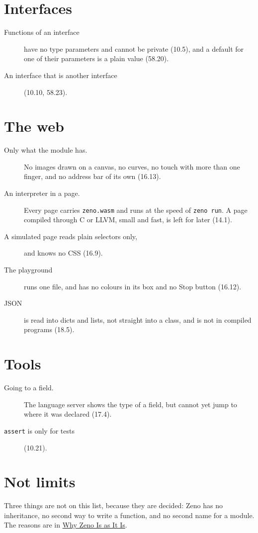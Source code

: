 \section{Interfaces}

\begin{description}
\item[Functions of an interface] have no type parameters and cannot
  be private (10.5), and a default for one of their parameters is a
  plain value (58.20).
\item[An interface that is another interface] (10.10, 58.23).
\end{description}

\section{The web}

\begin{description}
\item[Only what the module has.] No images drawn on a canvas, no
  curves, no touch with more than one finger, and no address bar of
  its own (16.13).
\item[An interpreter in a page.] Every page carries \verb|zeno.wasm|
  and runs at the speed of \verb|zeno run|. A page compiled through C
  or LLVM, small and fast, is left for later (14.1).
\item[A simulated page reads plain selectors only,] and knows no CSS
  (16.9).
\item[The playground] runs one file, and has no colours in its box and
  no Stop button (16.12).
\item[JSON] is read into dicts and lists, not straight into a class,
  and is not in compiled programs (18.5).
\end{description}

\section{Tools}

\begin{description}
\item[Going to a field.] The language server shows the type of a
  field, but cannot yet jump to where it was declared (17.4).
\item[\texttt{assert} is only for tests] (10.21).
\end{description}

\section{Not limits}

Three things are not on this list, because they are decided: Zeno has
no inheritance, no second way to write a function, and no second name
for a module. The reasons are in \hyperref[ch-design]{Why Zeno Is as It
Is}.
